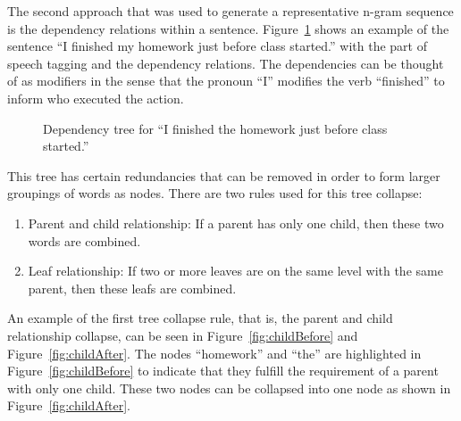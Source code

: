 \documentclass{article}[10]
\begin{document}
The second approach that was used to generate a representative n-gram sequence is the dependency relations within a sentence. Figure~\ref{fig:dep} shows an example of the sentence ``I finished my homework just before class started.'' with the part of speech tagging and the dependency relations. The dependencies can be thought of as modifiers in the sense that the pronoun ``I'' modifies the verb ``finished'' to inform who executed the action.

\begin{figure}[H]
  \begin{center}
    \caption{Dependency tree for ``I finished the homework just before class
      started.''\label{fig:dep}}
  \end{center}
\end{figure}

This tree has certain redundancies that can be removed in order to form larger groupings of words as nodes. There are two rules used for this tree collapse:

\begin{enumerate}[label= (\arabic*)]
    \item{Parent and child relationship: If a parent has only one child, then these two words are combined.}
    \item{Leaf relationship: If two or more leaves are on the same level with
    the same parent, then these leafs are combined.}
\end{enumerate}

An example of the first tree collapse rule, that is, the parent and child relationship collapse, can be seen in Figure~\ref{fig:childBefore} and Figure~\ref{fig:childAfter}. The nodes ``homework'' and ``the'' are highlighted in Figure~\ref{fig:childBefore} to indicate that they fulfill the requirement of a parent with only one child. These two nodes can be collapsed into one node as shown in Figure~\ref{fig:childAfter}.
\end{document}
